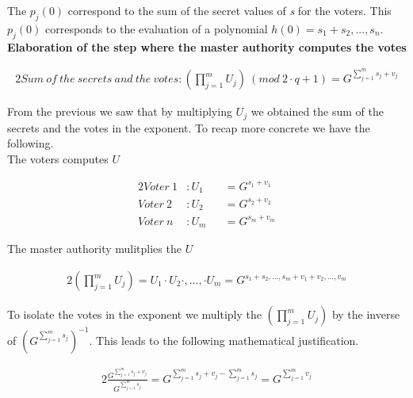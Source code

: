 \noindent
The \begin{math}p_j(0) \end{math} correspond to the sum of the secret values of \textit{s} for the voters. This \begin{math}p_j(0)\end{math} corresponds to the evaluation of a polynomial $h(0)= s_1 + s_2,..., s_n$.\\

\noindent
\textbf{Elaboration of the step where the master authority computes the votes}

\begin{alignat*}{2}
Sum \ of \ the \ secrets \ and \ the \  votes: (\prod\limits_{j=1}^{m} U_{j}) \ (mod \ 2 \cdot q+1)=  G^{ \sum\limits_{j=1}^m s_j +v_j}
\end{alignat*}

\noindent
From the previous we saw that by multiplying \begin{math}U_j \end{math} we obtained the sum of the secrets and the votes in the exponent. To recap more concrete we have the following. \\

\noindent
The voters computes $U$


\begin{alignat*}{2}
Voter \ 1 &: U_1 &&=G^{s_1+v_1}\\
Voter \ 2 &:U_2 &&=G^{s_2+v_2}\\
Voter \ n &:U_m &&=G^{s_m+v_m}
\end{alignat*}

\noindent
The  master  authority  mulitplies  the $U$

\begin{alignat*}{2}
(\prod\limits_{j=1}^{m} U_{j}) = U_1 \cdot U_2 \cdot,..., \cdot U_m = G^{s_1 + s_2,...,s_m + v_1 + v_2,..., v_m}
\end{alignat*}

\noindent
To isolate the votes in the exponent we multiply the  $(\prod\limits_{j=1}^{m} U_{j})$ by the inverse of $(G^{ \sum\limits_{j=1}^m s_j})^{-1}$. This leads to the following  mathematical justification.

\begin{alignat*}{2}
\frac{G^{ \sum\limits_{j=1}^m s_j +v_j}}{{ G^{ \sum\limits_{j=1}^m s_j} }} = G^{ \sum\limits_{j=1}^m s_j +v_j -\sum\limits_{j=1}^m s_j} = G^{ \sum\limits_{j=1}^m v_j}
\end{alignat*}


